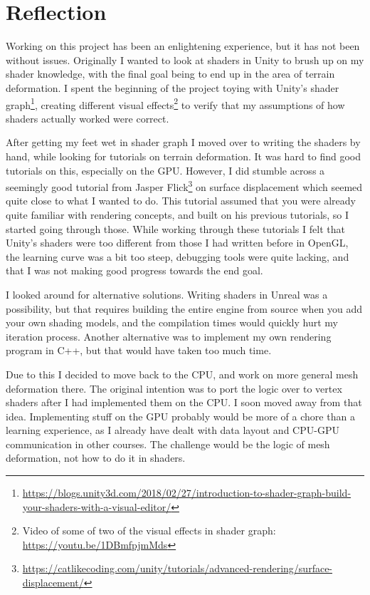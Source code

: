 \chapter{Reflection}
Working on this project has been an enlightening experience, but it has not been without issues.
Originally I wanted to look at shaders in Unity to brush up on my shader knowledge, with the final goal being to end up in the area of terrain deformation.
I spent the beginning of the project toying with Unity's shader graph\footnote{\url{https://blogs.unity3d.com/2018/02/27/introduction-to-shader-graph-build-your-shaders-with-a-visual-editor/}}, creating different visual effects\footnote{Video of some of two of the visual effects in shader graph: \url{https://youtu.be/1DBmfpjmMds}} to verify that my assumptions of how shaders actually worked were correct. 

After getting my feet wet in shader graph I moved over to writing the shaders by hand, while looking for tutorials on terrain deformation.
It was hard to find good tutorials on this, especially on the GPU. However, I did stumble across a seemingly good tutorial from Jasper Flick\footnote{\url{https://catlikecoding.com/unity/tutorials/advanced-rendering/surface-displacement/}} 
on surface displacement which seemed quite close to what I wanted to do.
This tutorial assumed that you were already quite familiar with rendering concepts, and built on his previous tutorials, so I started going through those.
While working through these tutorials I felt that Unity's shaders were too different from those I had written before in OpenGL, the learning curve
was a bit too steep, debugging tools were quite lacking, and that I was not making good progress towards the end goal.

I looked around for alternative solutions. Writing shaders in Unreal was a possibility, but that requires building the entire engine from source
when you add your own shading models\cite{unreal_shaders}, and the compilation times would quickly hurt my iteration process.
Another alternative was to implement my own rendering program in C++, but that would have taken too much time.

Due to this I decided to move back to the CPU, and work on more general mesh deformation there.
The original intention was to port the logic over to vertex shaders after I had implemented them on the CPU.
I soon moved away from that idea. Implementing stuff on the GPU probably would be more of a chore than a learning experience,
as I already have dealt with data layout and CPU-GPU communication in other courses.
The challenge would be the logic of mesh deformation, not how to do it in shaders.

